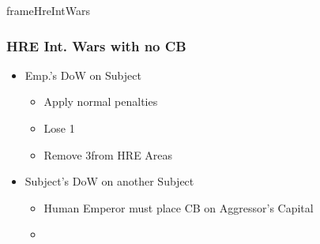 \documentclass[10pt]{article}
\newlength{\fhHreIntWars} \setlength\fhHreIntWars{9\baselineskip}
\begin{document}
\begin{dynamiccontents*}{frameHreIntWars}\begin{eubox}{\fhHreIntWars}
	\subsubsection*{HRE Int. Wars with no CB }
	\begin{itemize}
		\item Emp.'s DoW on Subject
		\begin{itemize}
			\item Apply normal penalties
			\item Lose 1\authority
			\item Remove 3\influence from HRE Areas
		\end{itemize}
		\item Subject's DoW on another Subject
		\begin{itemize}
			\item Human Emperor must place CB on Aggressor's Capital
			\item {}
		\end{itemize}
	\end{itemize}
\end{eubox}\end{dynamiccontents*}
\end{document}
